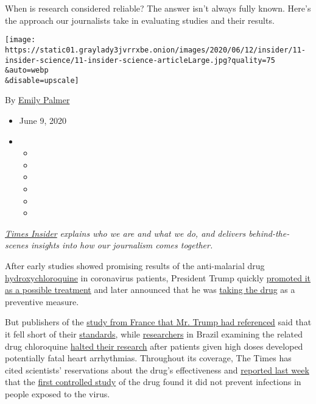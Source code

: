 When is research considered reliable? The answer isn't always fully
known. Here's the approach our journalists take in evaluating studies
and their results.

\texttt{[image: https://static01.graylady3jvrrxbe.onion/images/2020/06/12/insider/11-insider-science/11-insider-science-articleLarge.jpg?quality=75\\\&auto=webp\\\&disable=upscale]}

By \href{https://www.nytimes3xbfgragh.onion/by/emily-palmer}{Emily
Palmer}

\begin{itemize}
\item
  June 9, 2020
\item
  \begin{itemize}
  \item
  \item
  \item
  \item
  \item
  \item
  \end{itemize}
\end{itemize}

\href{https://www.nytimes3xbfgragh.onion/series/times-insider}{\emph{Times
Insider}} \emph{explains who we are and what we do, and delivers
behind-the-scenes insights into how our journalism comes together.}

After early studies showed promising results of the anti-malarial drug
\href{https://www.nytimes3xbfgragh.onion/article/hydroxychloroquine-coronavirus.html}{hydroxychloroquine}
in coronavirus patients, President Trump quickly
\href{https://www.nytimes3xbfgragh.onion/2020/04/05/us/politics/trump-hydroxychloroquine-coronavirus.html}{promoted
it as a possible treatment} and later announced that he was
\href{https://www.nytimes3xbfgragh.onion/2020/05/18/us/politics/trump-hydroxychloroquine-covid-coronavirus.html?smid=tw-nytimes\&smtyp=cur}{taking
the drug} as a preventive measure.

But publishers of the
\href{https://www.sciencedirect.com/science/article/pii/S0924857920300996}{study
from France that Mr. Trump had referenced} said that it fell short of
their
\href{https://retractionwatch.com/2020/04/06/hydroxychlorine-covid-19-study-did-not-meet-publishing-societys-expected-standard/}{standards},
while
\href{https://www.medrxiv.org/content/10.1101/2020.04.07.20056424v2}{researchers}
in Brazil examining the related drug chloroquine
\href{https://www.nytimes3xbfgragh.onion/2020/04/12/health/chloroquine-coronavirus-trump.html?smid=em-share}{halted
their research} after patients given high doses developed potentially
fatal heart arrhythmias. Throughout its coverage, The Times has cited
scientists' reservations about the drug's effectiveness and
\href{https://www.nytimes3xbfgragh.onion/2020/06/03/health/hydroxychloroquine-coronavirus-trump.html}{reported
last week} that the
\href{https://www.nejm.org/doi/full/10.1056/NEJMoa2016638}{first
controlled study} of the drug found it did not prevent infections in
people exposed to the virus.

